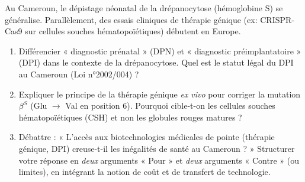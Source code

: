 \documentclass[11pt]{article}
\begin{document}
\begin{exercice}
Au Cameroun, le dépistage néonatal de la drépanocytose (hémoglobine S) se généralise. Parallèlement, des essais cliniques de thérapie génique (ex: CRISPR-Cas9 sur cellules souches hématopoïétiques) débutent en Europe.
\begin{enumerate}
    \item Différencier « diagnostic prénatal » (DPN) et « diagnostic préimplantatoire » (DPI) dans le contexte de la drépanocytose. Quel est le statut légal du DPI au Cameroun (Loi n°2002/004) ?
    \item Expliquer le principe de la thérapie génique \textit{ex vivo} pour corriger la mutation $\beta^S$ (Glu $\rightarrow$ Val en position 6). Pourquoi cible-t-on les cellules souches hématopoïétiques (CSH) et non les globules rouges matures ?
    \item Débattre : « L'accès aux biotechnologies médicales de pointe (thérapie génique, DPI) creuse-t-il les inégalités de santé au Cameroun ? » Structurer votre réponse en \textit{deux} arguments « Pour » et \textit{deux} arguments « Contre » (ou limites), en intégrant la notion de coût et de transfert de technologie.
\end{enumerate}
\end{exercice}
\end{document}

